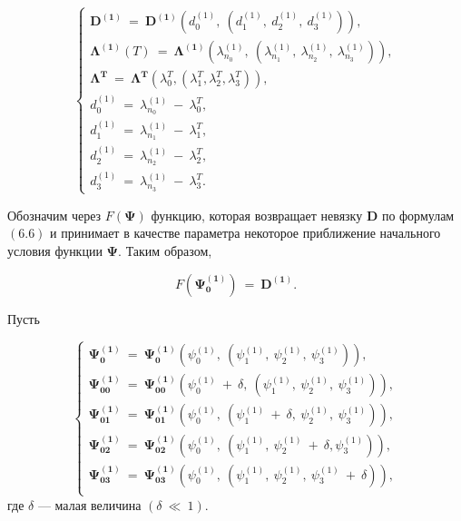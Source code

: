 \documentclass[14pt]{extreport}
\begin{document}
\begin{equation}
\begin{cases}
\boldsymbol{D^{(1)}}\ =\ \boldsymbol{D^{(1)}}(d_0^{(1)},\ (d_1^{(1)},\ d_2^{(1)},\ d_3^{(1)})), \\
\boldsymbol{\Lambda^{(1)}}(T)\ =\ \boldsymbol{\Lambda^{(1)}}(\lambda^{(1)}_{n_0},\ (\lambda^{(1)}_{n_1},\ \lambda^{(1)}_{n_2},\ \lambda^{(1)}_{n_3})), \\
\boldsymbol{\Lambda^T}\ =\ \boldsymbol{\Lambda^T}(\lambda_0^T, (\lambda_1^T, \lambda_2^T, \lambda_3^T)), \\
d_0^{(1)}\ =\ \lambda^{(1)}_{n_0}\ -\ \lambda_0^T, \\
d_1^{(1)}\ =\ \lambda^{(1)}_{n_1}\ -\ \lambda_1^T, \\
d_2^{(1)}\ =\ \lambda^{(1)}_{n_2}\ -\ \lambda_2^T, \\
d_3^{(1)}\ =\ \lambda^{(1)}_{n_3}\ -\ \lambda_3^T.
 \end{cases}
\end{equation}

Обозначим через $F(\boldsymbol\Psi)$ функцию, которая возвращает невязку $\boldsymbol{D}$ по формулам $(6.6)$ и
принимает в качестве параметра некоторое приближение начального условия функции $\boldsymbol\Psi$. Таким образом,

\begin{equation}
 F(\boldsymbol{\Psi_0^{(1)}})\ =\ \boldsymbol{D^{(1)}}.
\end{equation}

Пусть 

\begin{equation}
\begin{cases}
\boldsymbol{\Psi_{0}^{(1)}}\ =\ \boldsymbol{\Psi_{0}^{(1)}}(\psi_0^{(1)},\ (\psi_1^{(1)},\ \psi_2^{(1)},\ \psi_3^{(1)})), \\
\boldsymbol{\Psi_{00}^{(1)}}\ =\ \boldsymbol{\Psi_{00}^{(1)}}(\psi_0^{(1)}\ +\ \delta,\ (\psi_1^{(1)},\ \psi_2^{(1)},\ \psi_3^{(1)})), \\
\boldsymbol{\Psi_{01}^{(1)}}\ =\ \boldsymbol{\Psi_{01}^{(1)}}(\psi_0^{(1)},\ (\psi_1^{(1)}\ +\ \delta,\ \psi_2^{(1)},\ \psi_3^{(1)})), \\
\boldsymbol{\Psi_{02}^{(1)}}\ =\ \boldsymbol{\Psi_{02}^{(1)}}(\psi_0^{(1)},\ (\psi_1^{(1)},\ \psi_2^{(1)}\ +\ \delta, \psi_3^{(1)})), \\
\boldsymbol{\Psi_{03}^{(1)}}\ =\ \boldsymbol{\Psi_{03}^{(1)}}(\psi_0^{(1)},\ (\psi_1^{(1)},\ \psi_2^{(1)},\ \psi_3^{(1)}\ +\ \delta)), \\
\end{cases}
\end{equation}
где $\delta$ --- малая величина $(\delta\ \ll \ 1)$.
\end{document}
